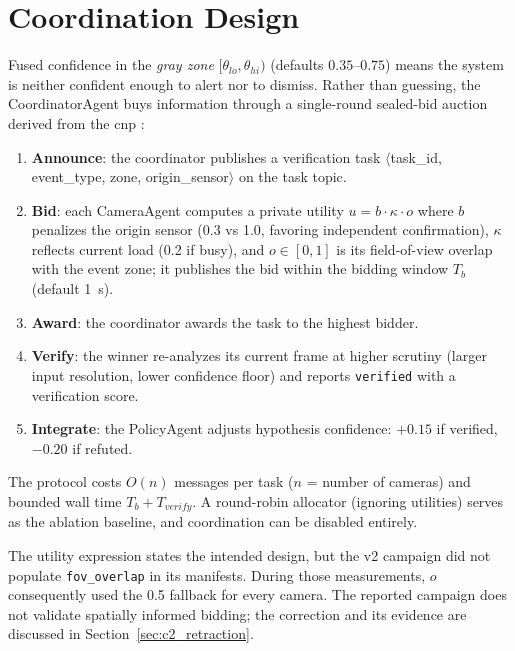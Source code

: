 \section{Coordination Design}
\label{sec:design_coordination}

Fused confidence in the \emph{gray zone} $[\theta_{lo}, \theta_{hi})$ (defaults $0.35$--$0.75$) means the system is neither confident enough to alert nor to dismiss. Rather than guessing, the CoordinatorAgent buys information through a single-round sealed-bid auction derived from the \gls{cnp} \cite{smith1980contract}:

\begin{enumerate}
    \item \textbf{Announce}: the coordinator publishes a verification task $\langle$task\_id, event\_type, zone, origin\_sensor$\rangle$ on the task topic.
    \item \textbf{Bid}: each CameraAgent computes a private utility $u = b \cdot \kappa \cdot o$ where $b$ penalizes the origin sensor (0.3 vs 1.0, favoring independent confirmation), $\kappa$ reflects current load (0.2 if busy), and $o \in [0,1]$ is its field-of-view overlap with the event zone; it publishes the bid within the bidding window $T_b$ (default 1~s).
    \item \textbf{Award}: the coordinator awards the task to the highest bidder.
    \item \textbf{Verify}: the winner re-analyzes its current frame at higher scrutiny (larger input resolution, lower confidence floor) and reports \texttt{verified} with a verification score.
    \item \textbf{Integrate}: the PolicyAgent adjusts hypothesis confidence: $+0.15$ if verified, $-0.20$ if refuted.
\end{enumerate}

The protocol costs $O(n)$ messages per task ($n$ = number of cameras) and bounded wall time $T_b + T_{verify}$. A round-robin allocator (ignoring utilities) serves as the ablation baseline, and coordination can be disabled entirely.

\begin{revisionbox}
The utility expression states the intended design, but the v2 campaign did not
populate \texttt{fov\_overlap} in its manifests. During those measurements,
$o$ consequently used the 0.5 fallback for every camera. The reported campaign
does not validate spatially informed bidding; the correction and its evidence
are discussed in Section~\ref{sec:c2_retraction}.
\end{revisionbox}

